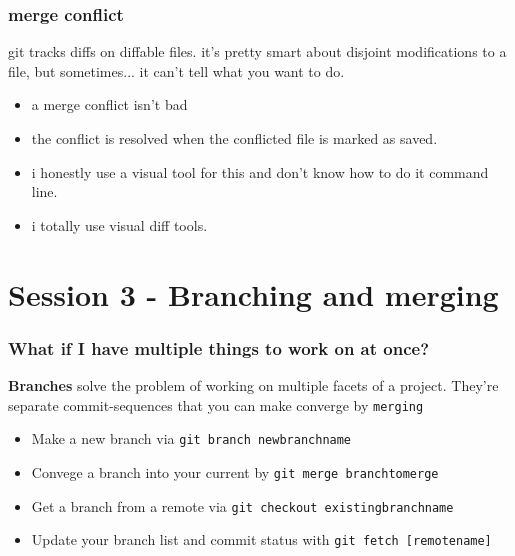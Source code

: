 \documentclass[14pt,aspectratio=1610]{beamer} %
\newcommand{\fframe}[2]{
   \begin{frame}
\frametitle{#1}
#2
\end{frame}
}
\begin{document}
\fframe{merge conflict}
{
	git tracks diffs on diffable files.  it's pretty smart about disjoint modifications to a file, but sometimes... it can't tell what you want to do.

		\begin{itemize}
	\item a merge conflict isn't bad
	\item the conflict is resolved when the conflicted file is marked as saved.  
	\item i honestly use a visual tool for this and don't know how to do it command line.  
	\item i totally use visual diff tools.  
\end{itemize}
}






























\section{Session 3 - Branching and merging}

\fframe{What if I have multiple things to work on at once?}
{
	{\bf Branches} solve the problem of working on multiple facets of a project.  They're separate commit-sequences that you can make converge by {\tt merging}

	\vspace{\baselineskip}

	\begin{itemize}
		\item Make a new branch via {\tt git branch newbranchname}
		\item Convege a branch into your current by {\tt git merge branchtomerge}
		\item Get a branch from a remote via {\tt git checkout existingbranchname}
		\item Update your branch list and commit status with {\tt git fetch [remotename]}
	\end{itemize}

}
\end{document}
